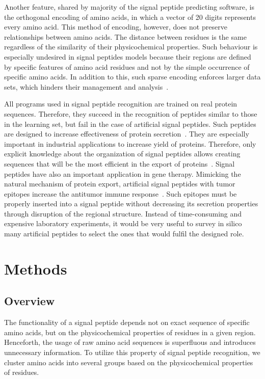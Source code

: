 \documentclass[fleqn,10pt,twoside]{gcb15submission}
\begin{document}
Another feature, shared by majority of the signal peptide predicting software, is the orthogonal encoding of amino acids, in which a vector of 20 digits represents every amino acid. This method of encoding, however, does not preserve relationships between amino acids. The distance between residues is the same regardless of the similarity of their physicochemical properties. Such behaviour is especially undesired in signal peptides models because their regions are defined by specific features of amino acid residues and not by the simple occurrence of specific amino acids. In addition to this, such sparse encoding enforces larger data sets, which hinders their management and analysis~\citep{2002linamino}.

All programs used in signal peptide recognition are trained on real protein sequences. Therefore, they succeed in the recognition of peptides similar to those in the learning set, but fail in the case of artificial signal peptides. Such peptides are designed to increase effectiveness of protein secretion~\citep{2010futatsumorisugaisignal}. They are especially important in industrial applications to increase yield of proteins. Therefore, only explicit knowledge about the organization of signal peptides allows creating sequences that will be the most efficient in the export of proteins~\citep{2013ngengineering}. Signal peptides have also an important application in gene therapy. Mimicking the natural mechanism of protein export, artificial signal peptides with tumor epitopes increase the antitumor immune response~\citep{2003heenhanced}. Such epitopes must be properly inserted into a signal peptide without decreasing its secretion properties through disruption of the regional structure. Instead of time-consuming and expensive laboratory experiments, it would be very useful to survey in silico many artificial peptides to select the ones that would fulfil the designed role.


\section*{Methods}

\subsection*{Overview}

The functionality of a signal peptide depends not on exact sequence of specific amino acids, but on the physicochemical properties of residues in a given region. Henceforth, the usage of raw amino acid sequences is superfluous and introduces unnecessary information. To utilize this property of signal peptide recognition, we cluster amino acids into several groups based on the physicochemical properties of residues.
\end{document}
